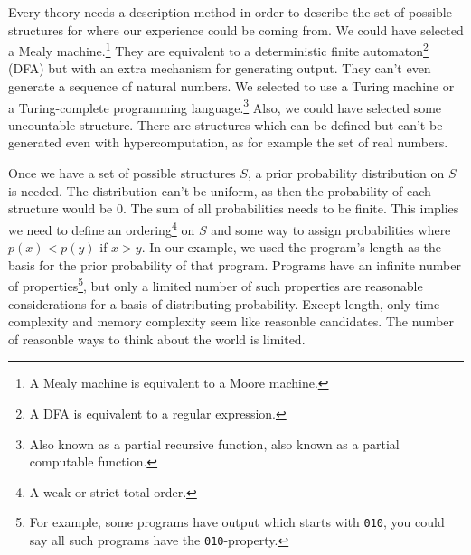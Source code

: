 Every theory needs a description method in order to describe the set of possible structures for where our experience could be coming from.
We could have selected a Mealy machine.\footnote{A Mealy machine is equivalent to a Moore machine.}
They are equivalent to a deterministic finite automaton\footnote{A DFA is equivalent to a regular expression.} (DFA) but with an extra mechanism for generating output.
They can't even generate a sequence of natural numbers.
We selected to use a Turing machine or a Turing-complete programming language.\footnote{Also known as a partial recursive function, also known as a partial computable function.}
Also, we could have selected some uncountable structure.
There are structures which can be defined but can't be generated even with hypercomputation, as for example the set of real numbers.

Once we have a set of possible structures $S$, a prior probability distribution on $S$ is needed.
The distribution can't be uniform, as then the probability of each structure would be 0.
The sum of all probabilities needs to be finite.
This implies we need to define an ordering\footnote{A weak or strict total order.} on $S$ and some way to assign probabilities where $p(x) < p(y)$ if $x > y$.
In our example, we used the program's length as the basis for the prior probability of that program.
Programs have an infinite number of properties\footnote{For example, some programs have output which starts with \texttt{010}, you could say all such programs have the \texttt{010}-property.}, but only a limited number of such properties are reasonable considerations for a basis of distributing probability.
Except length, only time complexity and memory complexity seem like reasonble candidates.
The number of reasonble ways to think about the world is limited.

\newpage

